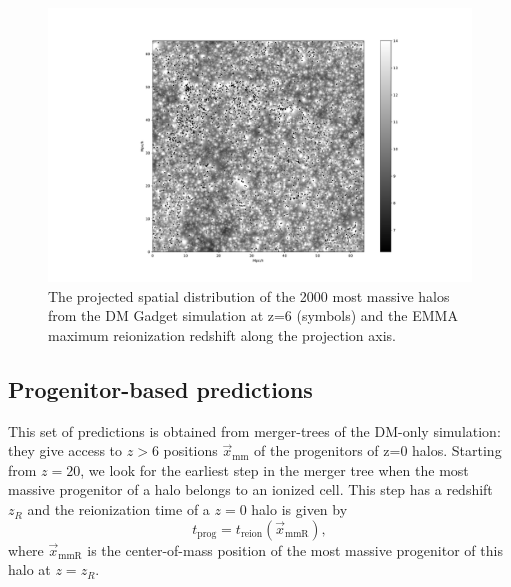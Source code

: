 \documentclass[twocolumn]{aastex61}
\newcommand{\dom}[1]{{#1}}
\begin{document}
\begin{figure}[ht]
\begin{center}
\includegraphics[width=2.3 \columnwidth]{img/maphalo.pdf}
\caption{The projected spatial distribution of the 2000 most massive halos from the DM Gadget simulation at z=6 (symbols) and \dom{the EMMA maximum reionization redshift along the projection axis}.}
\end{center}
\label{fig:reion_halo_map}
\end{figure}




\subsection{Progenitor-based predictions}
This set of predictions is obtained from merger-trees of the DM-only simulation: they give access to  $z>6$ positions $ \vec x_\mathrm{mm}$ of the progenitors of z=0 halos. Starting from $z=20$, we look for the earliest step in the merger tree when the most massive progenitor of a halo belongs to an ionized cell. This step has a redshift $z_R$ and the reionization time of a $z=0$ halo is given by
\begin{equation}
t_\mathrm{prog}=t_\mathrm{reion}(\vec x_\mathrm{mmR}),
\end{equation}
where $\vec x_\mathrm{mmR}$ is the center-of-mass position of the most massive progenitor of this halo at $z=z_R$.
\end{document}
